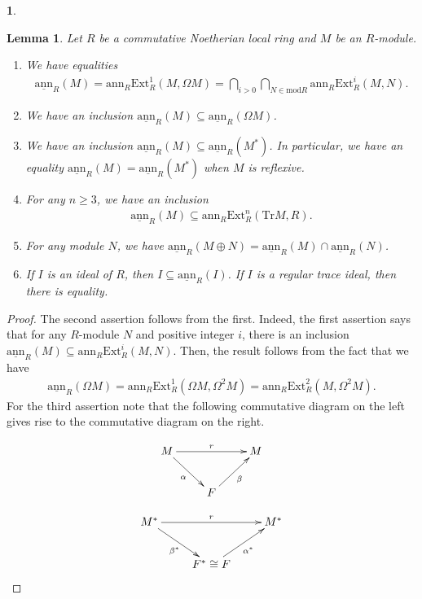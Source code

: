 \documentclass[12pt]{amsart}
\newcommand{\Ext}{\mathrm{Ext}}
\newcommand{\ann}{\mathrm{ann}}
\newcommand{\sann}{\underline{\mathrm{ann}}}
\newcommand{\module}{\mathrm{mod}}
\newtheorem{lemma}[theorem]{Lemma}
\theoremstyle{definition}
\newtheorem{chunk}[theorem]{}
\numberwithin{equation}{theorem}
\newcommand{\Tr}{\mathrm{Tr}}
\begin{document}
\begin{chunk}
\begin{lemma}\label{first-lemma-for-stable-annihilator}
    Let $R$ be a commutative Noetherian local ring and $M$ be an $R$-module.
    \begin{enumerate}
        \item \cite[Lemma 2.3]{Dao-Kobayashi-Takahashi} We have equalities
        \begin{align*}
            \sann_R (M) = \ann_R \Ext_R^1(M, \Omega M) = \bigcap_{i>0}\bigcap_{N \in \module R}  \ann_R \Ext_R^{i}(M,N). 
        \end{align*}
        \item We have an inclusion $\sann_R(M) \subseteq \sann_R(\Omega M)$.
        \item We have an inclusion $\sann_R(M) \subseteq \sann_R(M^*)$. In particular, we have an equality $\sann_R(M) = \sann_R(M^*)$ when $M$ is reflexive.
        \item For any $n \geq 3$, we have an inclusion 
        \begin{align*}
        \sann_R (M) \subseteq \ann_R \Ext_R^n(\Tr M, R).
        \end{align*}
        \item For any module $N$, we have $\sann_R(M \oplus N) = \sann_R(M) \cap \sann_R(N)$.
        \item If $I$ is an ideal of $R$, then $I \subseteq \sann_R(I)$. If $I$ is a regular trace ideal, then there is equality.
    \end{enumerate}
\end{lemma}
\begin{proof}
    The second assertion follows from the first. Indeed, the first assertion says that for any $R$-module $N$ and positive integer $i$, there is an inclusion $\sann_R(M) \subseteq \ann_R\Ext_R^i(M,N)$. Then, the result follows from the fact that we have
    \begin{align*}
        \sann_R(\Omega M) = \ann_R \Ext_R^1(\Omega M, \Omega^2M) = \ann_R \Ext_R^2(M, \Omega^2 M).
    \end{align*}
    For the third assertion note that the following commutative diagram on the left gives rise to the commutative diagram on the right.

    \begin{minipage}{.5\textwidth}
        \begin{align*}
            \xymatrix{
            M \ar^{r}[rr] \ar[dr]_\alpha  && M \\
            &F \ar[ur]_\beta&
            }
        \end{align*}
    \end{minipage}%
    \begin{minipage}{.5\textwidth}
        \begin{align*}
            \xymatrix{
            M^* \ar^{r}[rr] \ar[dr]_{\beta ^*}  && M^* \\
            &F^* \cong F \ar[ur]_{\alpha ^*}&
            }
        \end{align*}
    \end{minipage}


\end{proof}
\end{chunk}
\end{document}

